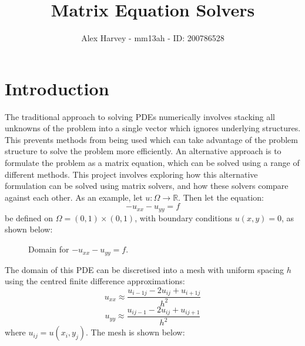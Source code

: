 \documentclass{article}
\title{Matrix Equation Solvers}
\author{Alex Harvey - mm13ah - ID: 200786528}
\date{}
\numberwithin{equation}{section}
\begin{document}
\maketitle
\section{Introduction}

The traditional approach to solving PDEs numerically involves stacking all unknowns of the problem into a single vector which ignores underlying structures. This prevents methods from being used which can take advantage of the problem structure to solve the problem more efficiently. An alternative approach is to formulate the problem as a matrix equation, which can be solved using a range of different methods. This project involves exploring how this alternative formulation can be solved using matrix solvers, and how these solvers compare against each other. As an example, let $u: \Omega \to \mathbb{R}$. Then let the equation:
	\begin{equation} 
	-u_{xx} - u_{yy} = f
	\end{equation}
be defined on $\Omega = (0,1) \times(0,1)$, with boundary conditions $u(x,y)=0$, as shown below:

\begin{figure}[H]
\centering
\caption{Domain for $-u_{xx}-u_{yy}=f$.}
\end{figure}

The domain of this PDE can be discretised into a mesh with uniform spacing $h$ using the centred finite difference approximations:
	\begin{equation} 
	u_{xx} \approx \frac{u_{i-1j} - 2u_{ij} + u_{i+1j}}{h^2}
	\end{equation}
	\begin{equation}
	u_{yy} \approx \frac{u_{ij-1} - 2u_{ij} + u_{ij+1}}{h^2}
	\end{equation}
where $u_{ij} = u(x_i, y_j)$. The mesh is shown below:
\end{document}
